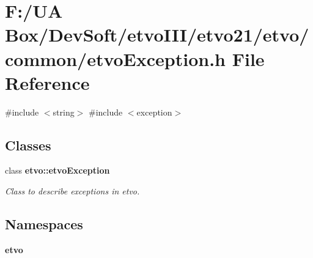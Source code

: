 \section{F\+:/\+UA Box/\+Dev\+Soft/etvo\+I\+I\+I/etvo21/etvo/common/etvo\+Exception.h File Reference}
\label{etvo_exception_8h}
{\ttfamily \#include $<$string$>$}\newline
{\ttfamily \#include $<$exception$>$}\newline
\subsection*{Classes}
\begin{DoxyCompactItemize}
\item 
class \textbf{ etvo\+::etvo\+Exception}
\begin{DoxyCompactList}\small\item\em Class to describe exceptions in etvo. \end{DoxyCompactList}\end{DoxyCompactItemize}
\subsection*{Namespaces}
\begin{DoxyCompactItemize}
\item 
 \textbf{ etvo}
\end{DoxyCompactItemize}
